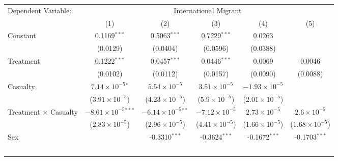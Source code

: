 \begingroup
\centering
\renewcommand{\arraystretch}{0.75}   %
\setlength{\aboverulesep}{0pt}       %
\setlength{\belowrulesep}{0pt} 
\begin{tabular}{lccccc}
   \tabularnewline \midrule \midrule
   Dependent Variable: & \multicolumn{5}{c}{International Migrant}\\
                                               
                                      & (1)                            & (2)                           & (3)                     & (4)                     & (5)\\  
   \midrule
   
   Constant                                    & 0.1169$^{***}$                 & 0.5063$^{***}$                & 0.7229$^{***}$          & 0.0263                  &   \\   
                                               & (0.0129)                       & (0.0404)                      & (0.0596)                & (0.0388)                &   \\   
   Treatment                                   & 0.1222$^{***}$                 & 0.0457$^{***}$                & 0.0446$^{***}$          & 0.0069                  & 0.0046\\   
                                               & (0.0102)                       & (0.0112)                      & (0.0157)                & (0.0090)                & (0.0088)\\   
   Casualty                               & $7.14\times 10^{-5}$$^{*}$     & $5.54\times 10^{-5}$          & $3.51\times 10^{-5}$    & $-1.93\times 10^{-5}$   &   \\   
                                               & ($3.91\times 10^{-5}$)         & ($4.23\times 10^{-5}$)        & ($5.9\times 10^{-5}$)   & ($2.01\times 10^{-5}$)  &   \\   
   Treatment $\times$ Casualty            & $-8.61\times 10^{-5}$$^{***}$  & $-6.14\times 10^{-5}$$^{**}$  & $-7.12\times 10^{-5}$   & $2.73\times 10^{-5}$    & $2.6\times 10^{-5}$\\    
                                               & ($2.83\times 10^{-5}$)         & ($2.96\times 10^{-5}$)        & ($4.41\times 10^{-5}$)  & ($1.66\times 10^{-5}$)  & ($1.68\times 10^{-5}$)\\    
   Sex                                         &                                & -0.3310$^{***}$               & -0.3624$^{***}$         & -0.1672$^{***}$         & -0.1703$^{***}$\\   
$$
\end{tabular}
